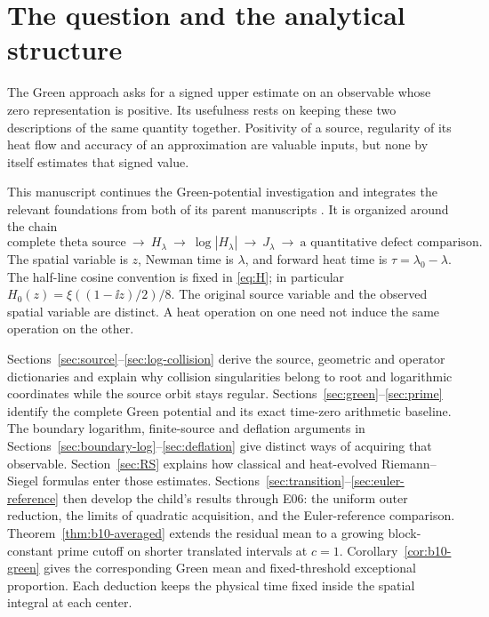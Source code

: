 \section{The question and the analytical structure}\label{sec:intro}

The Green approach asks for a signed upper estimate on an observable
whose zero representation is positive. Its usefulness rests on keeping
these two descriptions of the same quantity together. Positivity of a
source, regularity of its heat flow and accuracy of an approximation
are valuable inputs, but none by itself estimates that signed value.

This manuscript continues the Green-potential investigation and integrates
the relevant foundations from both of its parent manuscripts
\cite{GNPBackground,GNPOperator,OGParent}. It is organized around the chain
\[
 \text{complete theta source}\ \longrightarrow\ H_\lambda
 \ \longrightarrow\ \log|H_\lambda|\ \longrightarrow\ J_\lambda
 \ \longrightarrow\ \text{a quantitative defect comparison}.
\]
The spatial variable is \(z\), Newman time is \(\lambda\), and forward
heat time is \(\tau=\lambda_0-\lambda\). The half-line cosine convention
is fixed in \eqref{eq:H}; in particular \(H_0(z)=\xi((1-\ii z)/2)/8\).
The original source variable and the observed spatial variable are
distinct. A heat operation on one need not induce the same operation on
the other.

Sections~\ref{sec:source}--\ref{sec:log-collision} derive the source,
geometric and operator dictionaries and explain why collision singularities
belong to root and logarithmic coordinates while the source orbit stays
regular. Sections~\ref{sec:green}--\ref{sec:prime} identify the complete
Green potential and its exact time-zero arithmetic baseline. The boundary
logarithm, finite-source and deflation arguments in
Sections~\ref{sec:boundary-log}--\ref{sec:deflation} give distinct ways of
acquiring that observable. Section~\ref{sec:RS} explains how classical and
heat-evolved Riemann--Siegel formulas enter those estimates.
Sections~\ref{sec:transition}--\ref{sec:euler-reference} then develop
the child's results through E06: the uniform outer reduction, the
limits of quadratic acquisition, and the Euler-reference comparison.
Theorem~\ref{thm:b10-averaged} extends the residual mean to a growing
block-constant prime cutoff on shorter translated intervals at \(c=1\).
Corollary~\ref{cor:b10-green} gives the corresponding Green mean and
fixed-threshold exceptional proportion. Each deduction keeps the
physical time fixed inside the spatial integral at each center.


